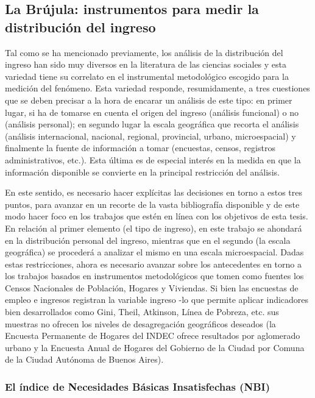 	\subsection{La Brújula: instrumentos para medir la distribución del ingreso}
	
Tal como se ha mencionado previamente, los análisis de la distribución del ingreso han sido muy diversos en la literatura de las ciencias sociales y esta variedad tiene su correlato en el instrumental metodológico escogido para la medición del fenómeno. Esta variedad responde, resumidamente, a tres cuestiones que se deben precisar a la hora de encarar un análisis de este tipo: en primer lugar, si ha de tomarse en cuenta el origen del ingreso (análisis funcional) o no (análisis personal); en segundo lugar la escala geográfica que recorta el análisis (análisis internacional, nacional, regional, provincial, urbano, microespacial) y finalmente la fuente de información a tomar (encuestas, censos, registros administrativos, etc.). Esta última es de especial interés en la medida en que la información disponible se convierte en la principal restricción del análisis. 

En este sentido, es necesario hacer explícitas las decisiones en torno a estos tres puntos, para avanzar en un recorte de la vasta bibliografía disponible y de este modo hacer foco en los trabajos que estén en línea con los objetivos de esta tesis. En relación al primer elemento (el tipo de ingreso), en este trabajo se ahondará en la distribución personal del ingreso, mientras que en el segundo (la escala geográfica) se procederá a analizar el mismo en una escala microespacial. Dadas estas restricciones, ahora es necesario avanzar sobre los antecedentes en torno a los trabajos basados en instrumentos metodológicos que tomen como fuentes los Censos Nacionales de Población, Hogares y Viviendas. Si bien las encuestas de empleo e ingresos registran la variable ingreso -lo que permite aplicar indicadores bien desarrollados como Gini, Theil, Atkinson, Línea de Pobreza, etc. \cite{worldbank,beccaria,altimir2002} sus muestras no ofrecen los niveles de desagregación geográficos deseados (la Encuesta Permanente de Hogares del INDEC ofrece resultados por aglomerado urbano y la Encuesta Anual de Hogares del Gobierno de la Ciudad por Comuna de la Ciudad Autónoma de Buenos Aires). 

\subsubsection{El índice de Necesidades Básicas Insatisfechas (NBI)}

